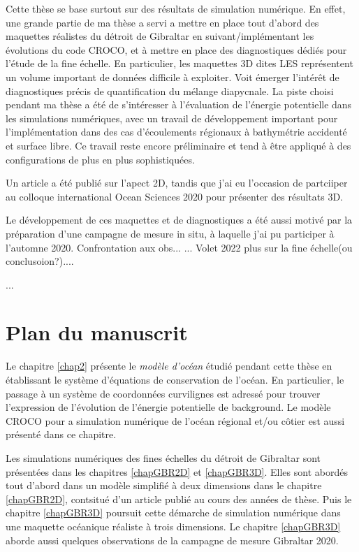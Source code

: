 Cette thèse se base surtout sur des résultats de simulation numérique. En effet, une grande partie de ma thèse a servi a mettre en place tout d'abord des maquettes réalistes du détroit de Gibraltar en suivant/implémentant les évolutions du code CROCO, et à mettre en place des diagnostiques dédiés pour l'étude de la fine échelle. En particulier, les maquettes 3D dites LES représentent un volume important de données difficile à exploiter. Voit émerger l'intérêt de diagnostiques précis de quantification du mélange diapycnale. La piste choisi pendant ma thèse a été de s'intéresser à l'évaluation de l'énergie potentielle dans les simulations numériques, avec un travail de développement important pour l'implémentation dans des cas d'écoulements régionaux à bathymétrie accidenté et surface libre. Ce travail reste encore préliminaire et tend à être appliqué à des configurations de plus en plus sophistiquées.

Un article a été publié sur l'apect 2D, tandis que j'ai eu l'occasion de partciiper au colloque international Ocean Sciences 2020 pour présenter des résultats 3D.

Le développement de ces maquettes et de diagnostiques a été aussi motivé par la préparation d'une campagne de mesure in situ, à laquelle j'ai pu participer à l'automne 2020. Confrontation aux obs... ... Volet 2022 plus sur la fine échelle(ou conclusoion?)....


\color{red}...\color{black}


\section{Plan du manuscrit}

Le chapitre \ref{chap2} présente le \textit{modèle d'océan} étudié pendant cette thèse en établissant le système d'équations de conservation de l'océan. En particulier, le passage à un système de coordonnées curvilignes est adressé pour trouver l'expression de l'évolution de l'énergie potentielle de background. Le modèle CROCO pour a simulation numérique de l'océan régional et/ou côtier est aussi présenté dans ce chapitre.

Les simulations numériques des fines échelles du détroit de Gibraltar sont présentées dans les chapitres \ref{chapGBR2D} et \ref{chapGBR3D}. Elles sont abordés tout d'abord dans un modèle simplifié à deux dimensions dans le chapitre \ref{chapGBR2D}, contsitué d'un article publié au cours des années de thèse. Puis le chapitre \ref{chapGBR3D} poursuit cette démarche de simulation numérique dans une maquette océanique réaliste à trois dimensions. Le chapitre \ref{chapGBR3D} aborde aussi quelques observations de la campagne de mesure Gibraltar 2020.

